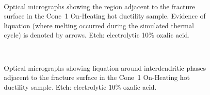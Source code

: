 {%
\begin{figure}
    \centering
     \\
    \caption{Optical micrographs showing the region adjacent to the fracture surface in the Cone~1 On-Heating \protect{} hot ductility sample. Evidence of liquation (where melting occurred during the simulated thermal cycle) is denoted by arrows. Etch: electrolytic 10\% oxalic acid.}
    \label{fig:c1-oh-2375}
\end{figure}

\begin{figure}
    \centering
     \\
    \caption{Optical micrographs showing liquation around interdendritic phases adjacent to the fracture surface in the Cone~1 On-Heating \protect{} hot ductility sample. Etch: electrolytic 10\% oxalic acid.}
    \label{fig:c1-oh-2375-fracture-liquation}
\end{figure}

}
